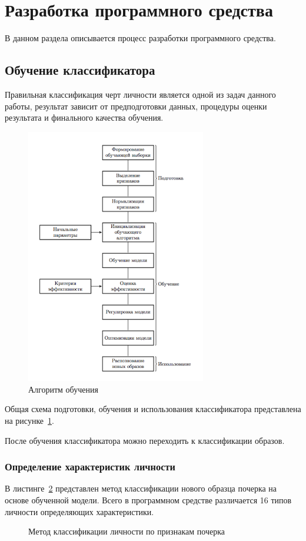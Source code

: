 \section{Разработка программного средства}
В данном раздела описывается процесс разработки программного \mbox{средства.}

\subsection{Обучение классификатора}
Правильная классификация черт личности является одной из задач данного работы, результат зависит от предподготовки данных, процедуры оценки результата и финального качества обучения.

\begin{figure}[h]
    \centering
    \includegraphics[width=0.7\textwidth]{figures/SVM_flow.png}
    \caption{Алгоритм обучения}
    \label{fig:develoipment:svm_flow}
\end{figure}

Общая схема подготовки, обучения и использования классификатора представлена на рисунке~\ref{fig:develoipment:svm_flow}.

После обучения классификатора можно переходить к классификации образов. 

\subsubsection{Определение характеристик личности}
В листинге~\ref{listing:development:classification} представлен метод классификации нового образца почерка на основе обученной модели. Всего в программном средстве различается 16 типов личности определяющих характеристики.
\begin{figure}[h]
    \centering
    
    \caption{Метод классификации личности по признакам почерка}
    \label{listing:development:classification}
\end{figure}

